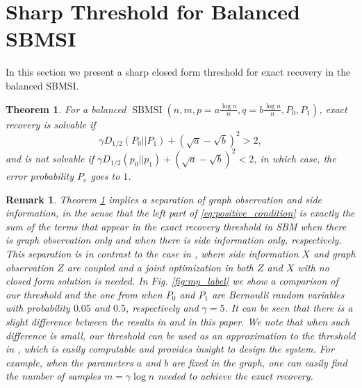 \documentclass[conference]{IEEEtran}
\newtheorem{theorem}{Theorem}
\newtheorem{remark}{Remark}
\DeclareMathOperator{\SBMSI}{SBMSI}
\begin{document}
	\section{Sharp Threshold for Balanced SBMSI}\label{s:sharp}
	In this section we present a sharp closed form threshold for exact recovery in the balanced SBMSI.  %
	\begin{theorem}\label{thm:Pe}
		For a balanced $\SBMSI(n,m,p=a\frac{\log n}{n},q=b\frac{\log n}{n},P_0,P_1)$, exact recovery is solvable if
		\begin{equation}\label{eq:positive_condition}
			\gamma D_{1/2}(P_0||P_1) + (\sqrt{a} - \sqrt{b})^2 > 2,
		\end{equation}
		and is not solvable if $\gamma D_{1/2}(p_0||p_1) + (\sqrt{a} - \sqrt{b})^2 < 2$, in which case, the error probability $P_e$ goes to $1$.
	\end{theorem}
	\begin{remark}
	Theorem \ref{thm:Pe} implies a separation of graph observation and side information, in the sense that the left part of \eqref{eq:positive_condition} is exactly the sum of the terms that appear in the exact recovery threshold in SBM  when there is graph observation only \cite{abbe2015exact} and when there is side information only, respectively. This separation is in contrast to the case in \cite{abbe17sideinfo}, where side information $X$ and graph observation $Z$ are coupled and a joint optimization in both $Z$ and $X$ with no closed form solution is needed. In Fig. \ref{fig:my_label} we show a comparison of our threshold and the one from \cite{abbe17sideinfo} when $P_0$ and $P_1$ are Bernoulli random variables with probability $ 0.05$ and $0.5$, respectively and $\gamma=5$.  It can be seen that there is a slight difference between the results in \cite{abbe17sideinfo} and in this paper.		We note that when such difference is small, our threshold can be used as an approximation to the threshold in \cite{abbe17sideinfo}, which is easily computable and provides insight to design the system. For example, when the parameters $a$ and $b$ are fixed in the graph, one can easily find the number of samples $m=\gamma\log n$ needed to achieve the exact recovery. 
	\end{remark}
\end{document}
